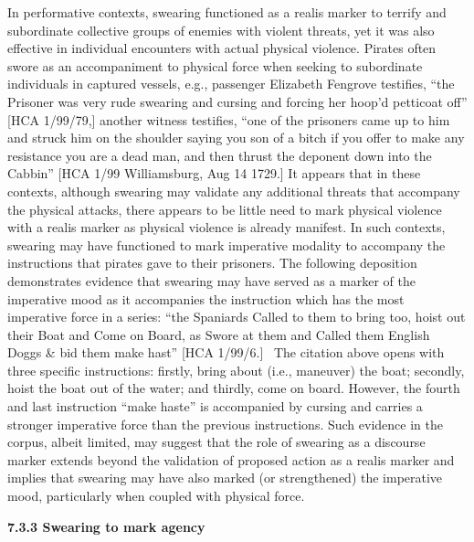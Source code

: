 \documentclass[12pt]{article}
\newenvironment{styleStandard}{\renewcommand\baselinestretch{1.0}\setlength\leftskip{0cm}\setlength\rightskip{0cm plus 1fil}\setlength\parindent{0cm}\setlength\parfillskip{0pt plus 1fil}\setlength\parskip{0in plus 1pt}\writerlistparindent\writerlistleftskip\leavevmode\normalfont\normalsize\writerlistlabel\ignorespaces}{\unskip\vspace{0in plus 1pt}\par}
\newcommand\writerlistleftskip{}
\newcommand\writerlistparindent{}
\newcommand\writerlistlabel{}
\begin{document}
\begin{styleStandard}
In performative contexts, swearing functioned as a realis marker to terrify and subordinate collective groups of enemies with violent threats, yet it was also effective in individual encounters with actual physical violence. Pirates often swore as an accompaniment to physical force when seeking to subordinate individuals in captured vessels, e.g., passenger Elizabeth Fengrove testifies, “the Prisoner was very rude swearing and cursing and forcing her hoop’d petticoat off” [HCA 1/99/79,] another witness testifies, “one of the prisoners came up to him and struck him on the shoulder saying you son of a bitch if you offer to make any resistance you are a dead man, and then thrust the deponent down into the Cabbin” [HCA 1/99 Williamsburg, Aug 14 1729.] It appears that in these contexts, although swearing may validate any additional threats that accompany the physical attacks, there appears to be little need to mark physical violence with a realis marker as physical violence is already manifest. In such contexts, swearing may have functioned to mark imperative modality to accompany the instructions that pirates gave to their prisoners. The following deposition demonstrates evidence that swearing may have served as a marker of the imperative mood as it accompanies the instruction which has the most imperative force in a series: “the Spaniards Called to them to bring too, hoist out their Boat and Come on Board, as Swore at them and Called them English Doggs \& bid them make hast” [HCA 1/99/6.] ~The citation above opens with three specific instructions: firstly, bring about (i.e., maneuver) the boat; secondly, hoist the boat out of the water; and thirdly, come on board. However, the fourth and last instruction “make haste” is accompanied by cursing and carries a stronger imperative force than the previous instructions. Such evidence in the corpus, albeit limited, may suggest that the role of swearing as a discourse marker extends beyond the validation of proposed action as a realis marker and implies that swearing may have also marked (or strengthened) the imperative mood, particularly when coupled with physical force. 
\end{styleStandard}


\begin{styleStandard}
\textbf{7.3.3 Swearing to mark agency}
\end{styleStandard}
\end{document}
